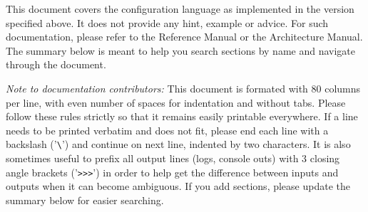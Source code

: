 \maketitle
\tableofcontents
\newpage

This document covers the configuration language as implemented in the version
specified above. It does not provide any hint, example or advice. For such
documentation, please refer to the Reference Manual or the Architecture Manual.
The summary below is meant to help you search sections by name and navigate
through the document.

\emph{Note to documentation contributors:}
This document is formated with 80 columns per line, with even number of
spaces for indentation and without tabs. Please follow these rules strictly
so that it remains easily printable everywhere. If a line needs to be
printed verbatim and does not fit, please end each line with a backslash
('\verb|\|') and continue on next line, indented by two characters. It is also
sometimes useful to prefix all output lines (logs, console outs) with 3
closing angle brackets ('\verb|>>>|') in order to help get the difference between
inputs and outputs when it can become ambiguous. If you add sections,
please update the summary below for easier searching.
